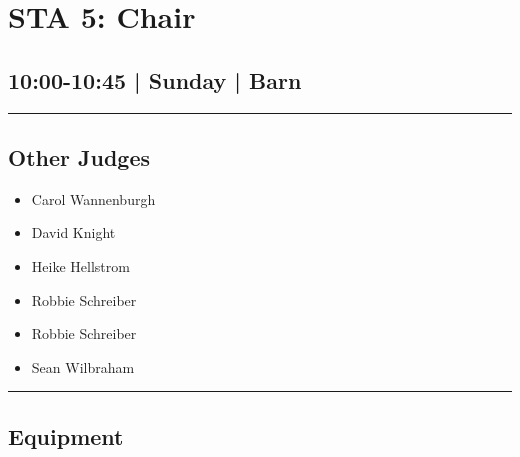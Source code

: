 \documentclass[10pt, A5]{article}
\begin{document}
        \begin{framed}
        \begin{minipage}{\textwidth}

        \setcounter{section}{70}
        \section{STA 5: Chair}
        \subsection*{10:00-10:45 | Sunday | Barn}

        \vspace{0.25cm}
        \hrule
        \vspace{0.25cm}


        \subsection*{Other Judges}
                    

        	\begin{multicols}{2}

		\begin{itemize}
									\item Carol Wannenburgh
									\item David Knight
									\item Heike Hellstrom
									\item Robbie Schreiber
						\end{itemize}

		\vfill\null
		\columnbreak

		\begin{itemize}
									\item Robbie Schreiber
									\item Sean Wilbraham
						\end{itemize}

		\vfill\null

		\end{multicols}

    \vspace{0.25cm}
        \hrule
        \vspace{0.25cm}

        \begin{multicols}{2}

		\section*{\faWrench \: Equipment}


\end{multicols}
\end{minipage}
\end{framed}
\end{document}
